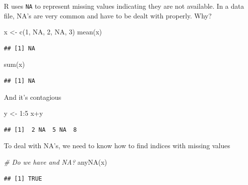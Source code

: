 \documentclass[
]{book}
\newenvironment{Shaded}{\begin{snugshade}}{\end{snugshade}}
\newcommand{\CommentTok}[1]{\textcolor[rgb]{0.56,0.35,0.01}{\textit{#1}}}
\newcommand{\ConstantTok}[1]{\textcolor[rgb]{0.00,0.00,0.00}{#1}}
\newcommand{\DecValTok}[1]{\textcolor[rgb]{0.00,0.00,0.81}{#1}}
\newcommand{\FunctionTok}[1]{\textcolor[rgb]{0.00,0.00,0.00}{#1}}
\newcommand{\NormalTok}[1]{#1}
\newcommand{\OtherTok}[1]{\textcolor[rgb]{0.56,0.35,0.01}{#1}}
\newcommand{\SpecialCharTok}[1]{\textcolor[rgb]{0.00,0.00,0.00}{#1}}
\theoremstyle{definition}
\theoremstyle{definition}
\theoremstyle{definition}
\theoremstyle{definition}
\theoremstyle{remark}
\begin{document}
R uses \texttt{NA} to represent missing values indicating they are not available. In a data file, NA's are very common and have to be dealt with properly. Why?

\begin{Shaded}
\begin{Highlighting}[]
\NormalTok{x }\OtherTok{\textless{}{-}} \FunctionTok{c}\NormalTok{(}\DecValTok{1}\NormalTok{, }\ConstantTok{NA}\NormalTok{, }\DecValTok{2}\NormalTok{, }\ConstantTok{NA}\NormalTok{, }\DecValTok{3}\NormalTok{)}
\FunctionTok{mean}\NormalTok{(x)}
\end{Highlighting}
\end{Shaded}

\begin{verbatim}
## [1] NA
\end{verbatim}

\begin{Shaded}
\begin{Highlighting}[]
\FunctionTok{sum}\NormalTok{(x)}
\end{Highlighting}
\end{Shaded}

\begin{verbatim}
## [1] NA
\end{verbatim}

And it's contagious

\begin{Shaded}
\begin{Highlighting}[]
\NormalTok{y }\OtherTok{\textless{}{-}} \DecValTok{1}\SpecialCharTok{:}\DecValTok{5}
\NormalTok{x}\SpecialCharTok{+}\NormalTok{y}
\end{Highlighting}
\end{Shaded}

\begin{verbatim}
## [1]  2 NA  5 NA  8
\end{verbatim}

To deal with NA's, we need to know how to find indices with missing values

\begin{Shaded}
\begin{Highlighting}[]
\CommentTok{\# Do we have and NA?}
\FunctionTok{anyNA}\NormalTok{(x)}
\end{Highlighting}
\end{Shaded}

\begin{verbatim}
## [1] TRUE
\end{verbatim}
\end{document}

